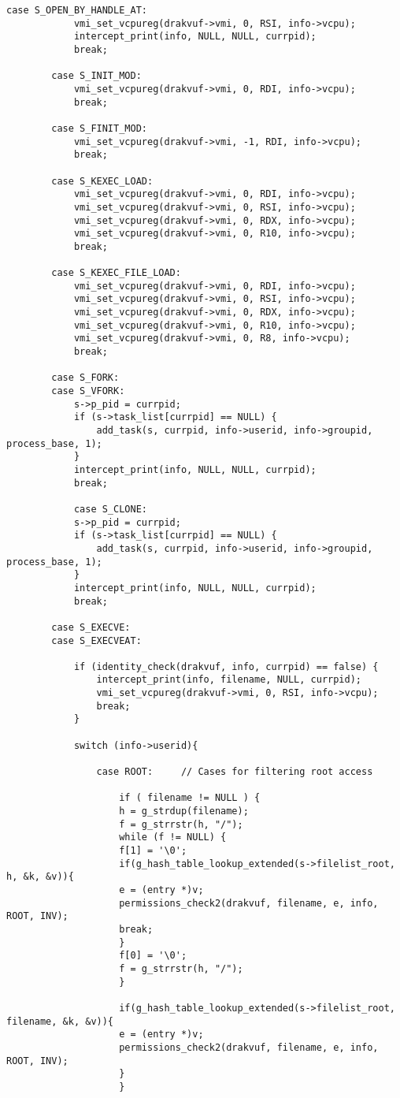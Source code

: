 {\begin{lstlisting}[style=CStyle]
		case S_OPEN_BY_HANDLE_AT:
			vmi_set_vcpureg(drakvuf->vmi, 0, RSI, info->vcpu);
			intercept_print(info, NULL, NULL, currpid);
			break;
		
		case S_INIT_MOD:
			vmi_set_vcpureg(drakvuf->vmi, 0, RDI, info->vcpu);
			break;
		
		case S_FINIT_MOD:
			vmi_set_vcpureg(drakvuf->vmi, -1, RDI, info->vcpu);
			break;	
		
		case S_KEXEC_LOAD:
			vmi_set_vcpureg(drakvuf->vmi, 0, RDI, info->vcpu);
			vmi_set_vcpureg(drakvuf->vmi, 0, RSI, info->vcpu);
			vmi_set_vcpureg(drakvuf->vmi, 0, RDX, info->vcpu);
			vmi_set_vcpureg(drakvuf->vmi, 0, R10, info->vcpu);
			break;	
		
		case S_KEXEC_FILE_LOAD:
			vmi_set_vcpureg(drakvuf->vmi, 0, RDI, info->vcpu);
			vmi_set_vcpureg(drakvuf->vmi, 0, RSI, info->vcpu);
			vmi_set_vcpureg(drakvuf->vmi, 0, RDX, info->vcpu);
			vmi_set_vcpureg(drakvuf->vmi, 0, R10, info->vcpu);
			vmi_set_vcpureg(drakvuf->vmi, 0, R8, info->vcpu);
			break;	
		
		case S_FORK:
		case S_VFORK:
			s->p_pid = currpid;
			if (s->task_list[currpid] == NULL) {
				add_task(s, currpid, info->userid, info->groupid, process_base, 1);
			}
			intercept_print(info, NULL, NULL, currpid);
			break;
			
			case S_CLONE:
			s->p_pid = currpid;
			if (s->task_list[currpid] == NULL) {
				add_task(s, currpid, info->userid, info->groupid, process_base, 1);
			}
			intercept_print(info, NULL, NULL, currpid);
			break;
		
		case S_EXECVE:
		case S_EXECVEAT:
		
			if (identity_check(drakvuf, info, currpid) == false) {
				intercept_print(info, filename, NULL, currpid);
				vmi_set_vcpureg(drakvuf->vmi, 0, RSI, info->vcpu);
				break;
			}
			
			switch (info->userid){
			
				case ROOT:     // Cases for filtering root access
				
					if ( filename != NULL ) {
					h = g_strdup(filename);
					f = g_strrstr(h, "/");
					while (f != NULL) {
					f[1] = '\0';
					if(g_hash_table_lookup_extended(s->filelist_root, h, &k, &v)){
					e = (entry *)v;
					permissions_check2(drakvuf, filename, e, info, ROOT, INV);
					break;
					}
					f[0] = '\0';
					f = g_strrstr(h, "/");
					}
					
					if(g_hash_table_lookup_extended(s->filelist_root, filename, &k, &v)){
					e = (entry *)v;
					permissions_check2(drakvuf, filename, e, info, ROOT, INV);
					}
					}
					

\end{lstlisting}}
